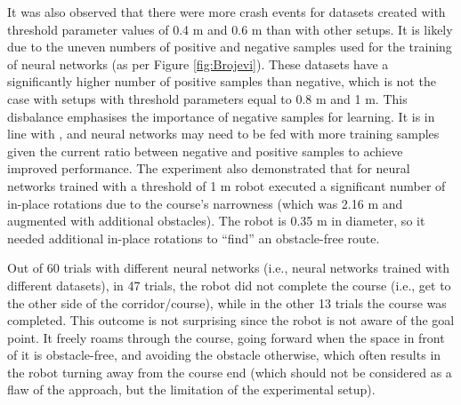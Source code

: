 It was also observed that there were more crash events for datasets created with threshold parameter values of 0.4 m and 0.6 m than with other setups. It is likely due to the uneven numbers of positive and negative samples used for the training of neural networks (as per Figure \ref{fig:Brojevi}). These datasets have a significantly higher number of positive samples than negative, which is not the case with setups with threshold parameters equal to 0.8 m and 1 m. This disbalance emphasises the importance of negative samples for learning. It is in line with \cite{Gandhi2017}, and neural networks may need to be fed with more training samples given the current ratio between negative and positive samples to achieve improved performance. The experiment also demonstrated that for neural networks trained with a threshold of  1 m robot executed a significant number of in-place rotations due to the course's narrowness (which was 2.16 m and augmented with additional obstacles). The robot is 0.35 m in diameter, so it needed additional in-place rotations to ``find'' an obstacle-free route.

Out of 60 trials with different neural networks (i.e., neural networks trained with different datasets), in 47 trials, the robot did not complete the course (i.e., get to the other side of the corridor/course), while in the other 13 trials the course was completed. This outcome is not surprising since the robot is not aware of the goal point. It freely roams through the course, going forward when the space in front of it is obstacle-free, and avoiding the obstacle otherwise, which often results in the robot turning away from the course end (which should not be considered as a flaw of the approach, but the limitation of the experimental setup).

